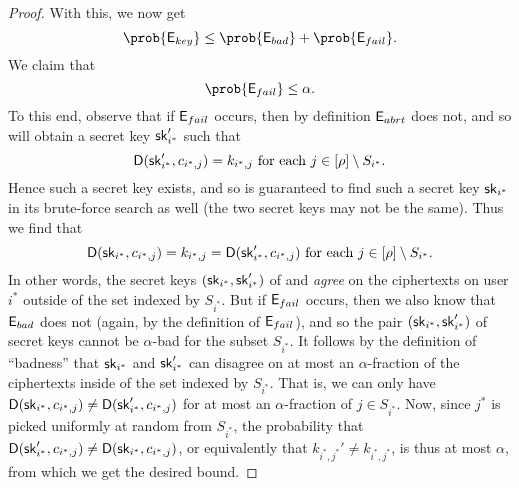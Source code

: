 \begin{proof}
  With this, we now get
  \[
    \prob{\eventE_{key}} \le \prob{\eventE_{bad}} + \prob{\eventE_{fail}}.
  \]
  We claim that
  \[
    \prob{\eventE_{fail}} \le \alpha.
  \]
  To this end, observe that if \(\mathsf{E}_{fail}\) occurs,
  then by definition \(\mathsf{E}_{abrt}\) does not, and so
  \redM will obtain a secret key \(\mathsf{sk}_{i^{*}}'\) such that
  \[
    \mathsf{D}(\mathsf{sk}_{i^{*}}',c_{i^{*},j}) = k_{i^{*},j} \text{ for each } j \in [\rho] \setminus S_{i^{*}}.
  \]
  Hence such a secret key exists, and so \advA is guaranteed to find such a secret key \(\mathsf{sk}_{i^{*}}\)
  in its brute-force search as well (the two secret keys may not be the same).
  Thus we find that
  \[
    \mathsf{D}(\mathsf{sk}_{i^{*}},c_{i^{*},j}) = k_{i^{*},j} = \mathsf{D}(\mathsf{sk}_{i^{*}}',c_{i^{*},j}) \text{ for each } j \in [\rho] \setminus S_{i^{*}}.
  \]
  In other words, the secret keys \((\mathsf{sk}_{i^{*}},\mathsf{sk}_{i^{*}}')\)
  of \advA and \redM \emph{agree} on the ciphertexts on user \(i^{*}\) outside of the set indexed by \(S_{i^{*}}\).
  But if \(\mathsf{E}_{fail}\) occurs, then we also know that \(\mathsf{E}_{bad}\) does not
  (again, by the definition of \(\mathsf{E}_{fail}\)),
  and so the pair \((\mathsf{sk}_{i^{*}},\mathsf{sk}_{i^{*}}')\) of secret keys cannot be
  \(\alpha\)-bad for the subset \(S_{i^{*}}\).
  It follows by the definition of ``badness'' that \(\mathsf{sk}_{i^{*}}\) and \(\mathsf{sk}_{i^{*}}'\)
  can disagree on at most an \(\alpha\)-fraction of the ciphertexts inside of the set indexed by \(S_{i^{*}}\).
  That is, we can only have
  \(\mathsf{D}(\mathsf{sk}_{i^{*}},c_{i^{*},j}) \ne \mathsf{D}(\mathsf{sk}_{i^{*}}',c_{i^{*},j})\)
  for at most an \(\alpha\)-fraction of \(j \in S_{i^{*}}\).
  Now, since \(j^{*}\) is picked uniformly at random from \(S_{i^{*}}\),
  the probability that
  \(\mathsf{D}(\mathsf{sk}_{i^{*}}',c_{i^{*},j}) \ne \mathsf{D}(\mathsf{sk}_{i^{*}},c_{i^{*},j})\),
  or equivalently that \(k_{i^{*},j^{*}}' \ne k_{i^{*},j^{*}}\),
  is thus at most \(\alpha\),
  from which we get the desired bound.


\end{proof}
